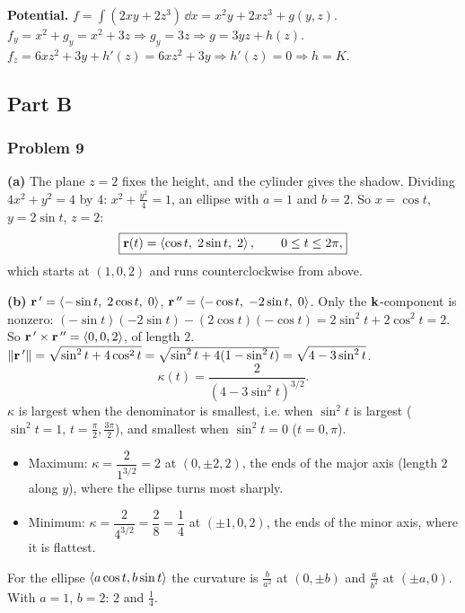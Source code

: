 \textbf{Potential.}
 $f=\int(2xy+2z^3)\,\dd x=x^2y+2xz^3+g(y,z)$.
 $f_y=x^2+g_y=x^2+3z\Rightarrow g_y=3z\Rightarrow g=3yz+h(z)$.
 $f_z=6xz^2+3y+h'(z)=6xz^2+3y\Rightarrow h'(z)=0\Rightarrow h=K$.


\subsection{Part B}

\subsubsection*{Problem 9}

\textbf{(a)} The plane $z=2$ fixes the height, and the cylinder gives the shadow.
Dividing $4x^2+y^2=4$ by $4$: $x^2+\frac{y^2}{4}=1$, an ellipse with $a=1$ and $b=2$. So
$x=\cos t$, $y=2\sin t$, $z=2$:
\[
  \boxed{\mathbf{r}(t)=\left\langle \cos t,\;2\sin t,\;2 \right\rangle,\qquad0\le t\le2\pi,}
\]
which starts at $(1,0,2)$ and runs counterclockwise from above.

\textbf{(b)}
 $\mathbf{r}\,'=\left\langle -\sin t,\;2\cos t,\;0 \right\rangle$, $\mathbf{r}\,''=\left\langle -\cos t,\;-2\sin t,\;0 \right\rangle$.
 Only the $\mathbf{k}$-component is nonzero:
$(-\sin t)(-2\sin t)-(2\cos t)(-\cos t)=2\sin^2t+2\cos^2t=2$. So $\mathbf{r}\,'\times\mathbf{r}\,''=\left\langle 0,0,2 \right\rangle$, of length $2$.
 $\lVert\mathbf{r}\,'\rVert=\sqrt{\sin^2t+4\cos^2t}=\sqrt{\sin^2t+4(1-\sin^2t)}=\sqrt{4-3\sin^2t}$.
\[
  \kappa(t)=\frac{2}{\left(4-3\sin^2t\right)^{3/2}} .
\]
 $\kappa$ is largest when the denominator is smallest, i.e.
when $\sin^2t$ is largest ($\sin^2t=1$, $t=\frac\pi2,\frac{3\pi}{2}$), and smallest when
$\sin^2t=0$ ($t=0,\pi$).
\begin{itemize}
\item Maximum: $\kappa=\dfrac{2}{1^{3/2}}=\boxed{2}$ at $(0,\pm2,2)$, the ends of the major
      axis (length $2$ along $y$), where the ellipse turns most sharply.
\item Minimum: $\kappa=\dfrac{2}{4^{3/2}}=\dfrac28=\boxed{\dfrac14}$ at $(\pm1,0,2)$, the ends of the
      minor axis, where it is flattest.
\end{itemize}

\begin{altmethod}
For the ellipse $\left\langle a\cos t,b\sin t \right\rangle$ the curvature is $\frac{b}{a^2}$ at $(0,\pm b)$
and $\frac{a}{b^2}$ at $(\pm a,0)$. With $a=1$, $b=2$: $2$ and $\frac14$.
\end{altmethod}

